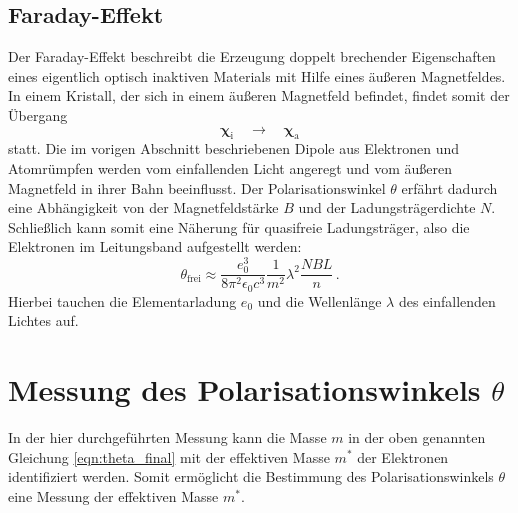 \subsection{Faraday-Effekt} %
\label{sub:faraday_effekt}
Der Faraday-Effekt beschreibt die Erzeugung doppelt brechender
Eigenschaften eines eigentlich optisch inaktiven Materials mit Hilfe eines
äußeren Magnetfeldes.
In einem Kristall, der sich in einem äußeren Magnetfeld befindet,
findet somit der Übergang
\begin{equation}
\label{eq:inaktiv_to_aktiv}
    \mathbf{\chi}_\text{i} \quad \to \quad \mathbf{\chi}_\text{a}
\end{equation}
statt.
Die im vorigen Abschnitt beschriebenen Dipole aus Elektronen und Atomrümpfen
werden vom einfallenden Licht angeregt und vom äußeren Magnetfeld
in ihrer Bahn beeinflusst.
%
Der Polarisationswinkel $\theta$ erfährt dadurch eine Abhängigkeit
von der Magnetfeldstärke $B$ und der Ladungsträgerdichte $N$.
Schließlich kann somit eine Näherung für quasifreie Ladungsträger,
also die Elektronen im Leitungsband aufgestellt werden:
\begin{equation}
    \label{eqn:theta_final}
    \theta_\text{frei}
    \approx \frac{e_0^3}{8\pi^2\epsilon_0 c^3}
    \frac{1}{m^2}\lambda^2 \frac{NBL}{n}\,.
\end{equation}
Hierbei tauchen die Elementarladung $e_0$ und die Wellenlänge $\lambda$ des
einfallenden Lichtes auf.

\clearpage
\section{Messung des Polarisationswinkels $\theta$} %
\label{sec:messung}
In der hier durchgeführten Messung kann die Masse $m$ in der oben genannten
Gleichung \eqref{eqn:theta_final} mit der effektiven Masse $m^*$ der
Elektronen identifiziert werden.
Somit ermöglicht die Bestimmung des Polarisationswinkels $\theta$ eine Messung
der effektiven Masse $m^*$.

